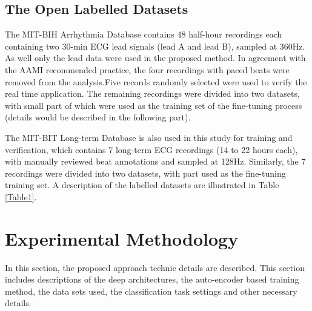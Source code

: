 \documentclass[journal]{IEEEtran}
\begin{document}
\subsection{The Open Labelled Datasets}

The MIT-BIH Arrhythmia Database \cite{physionet} contains 48 half-hour recordings each containing two 30-min ECG lead signals (lead A and lead B), sampled at 360Hz. As well only the  lead \uppercase\expandafter{} data were used in the proposed method. In agreement with the AAMI recommended practice, the four recordings with paced beats were removed from the analysis.Five records randomly selected were used to verify the real time application. The remaining recordings were divided into two datasets, with small part of which were used as the training set of the fine-tuning process (details would be described in the following part).

The MIT-BIT Long-term Database is also used in this study for training and verification, which contains 7 long-term ECG recordings (14 to 22 hours each), with manually reviewed beat annotations and sampled at 128Hz. Similarly, the 7 recordings were divided into two datasets, with part used as the fine-tuning training set. A description of the labelled datasets are illustrated in Table \ref{Table1}.



\section{Experimental Methodology}
In this section, the proposed approach technic details are described. This section includes descriptions of the deep architectures, the auto-encoder based training method, the data sets used, the classification task settings and other necessary details.
\end{document}
